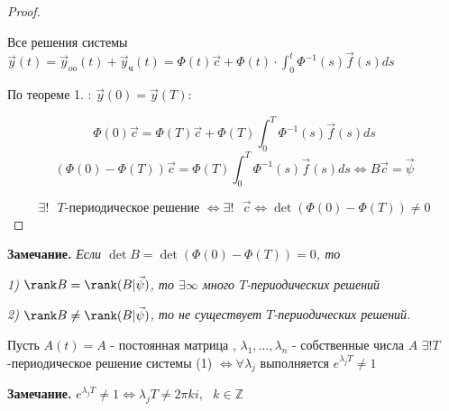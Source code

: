 \documentclass[12pt, a4paper]{report}
\begin{document}
\begin{proof}
    \begin{flushleft}
        Все решения системы \( \displaystyle  \vec{y }  (t) = \vec{ y } _{oo} (t )+ \vec{y } _{\text{ч} }(t ) = \Phi(t ) \vec{c }  + \Phi(t ) \cdot \int_{0}^{t }  \Phi^{-1 } (s ) \vec{f } (s )ds   \) 
    \end{flushleft}

    По теореме 1. : \( \vec{y } (0) = \vec{y } (T )  \):

    \[\Phi ( 0) \vec{c } = \Phi (T ) \vec{c }  + \Phi (T ) \int_{0 }^{T }  \Phi^{-1 }  (s ) \vec{f } (s ) ds   \] 
    \[ (\Phi(0 )- \Phi(T ))\vec{c }  = \Phi(T ) \int_{0 }^{T } \Phi^{-1 } (s )\vec{f } (s )ds \Leftrightarrow  B \vec{c }  = \vec{\psi}  \]  

    \[ \exists ! \text{ } T\text{-периодическое решение  } \Leftrightarrow \exists ! \text{ }  \vec{c }  \Leftrightarrow  \det  (\Phi(0 )- \Phi(T )) \neq 0  \] 
\end{proof}

\begin{flushleft}
    \textbf{Замечание. } \textit{Если \( \det  B = \det  (\Phi(0 )- \Phi(T ))  = 0\), то}
    
    \textit{1) \( \rank B  = \rank  (B|\vec{\psi} ) \), то \( \exists \infty   \)  много \( T \)-периодических решений } 
    
    \textit{2) \( \rank B \neq  \rank (B|\vec{\psi} ) \), то не существует \( T \)-периодических решений. } 
\end{flushleft}

\begin{theorem}
    Пусть \(  A(t ) = A\) - постоянная матрица , \( \lambda_1, \ldots, \lambda_n \) - собственные числа \( A  \) \( \exists ! T \)-периодическое решение системы (1) \( \Leftrightarrow  \forall  \lambda_j \) выполняется \( e^{\lambda_j T } \neq 1  \) 
\end{theorem}

\begin{flushleft}
    \textbf{Замечание. } \textit{ \( e^{ \lambda_j T } \neq 1 \Leftrightarrow  \lambda_j T \neq 2 \pi k i , \text{ } k \in  \mathbb{Z} \) }  
\end{flushleft}
\end{document}
